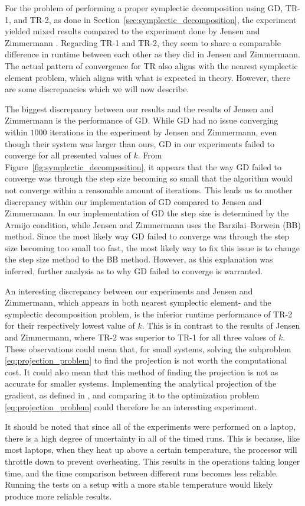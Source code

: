 For the problem of performing a proper symplectic decomposition using GD, TR-1, and TR-2, as done in Section~\ref{sec:symplectic_decomposition}, the experiment yielded mixed results compared to the experiment done by Jensen and Zimmermann \cite[Tbl.~4.4]{JensenZimmermann2024}. Regarding TR-1 and TR-2, they seem to share a comparable difference in runtime between each other as they did in Jensen and Zimmermann. The actual pattern of convergence for TR also aligns with the nearest symplectic element problem, which aligns with what is expected in theory. However, there are some discrepancies which we will now describe. 

The biggest discrepancy between our results and the results of Jensen and Zimmermann \cite[Tbl.~4.4]{JensenZimmermann2024} is the performance of GD. While GD had no issue converging within $1000$ iterations in the experiment by Jensen and Zimmermann, even though their system was larger than ours, GD in our experiments failed to converge for all presented values of $k$. From Figure~\ref{fig:symplectic_decomposition}, it appears that the way GD failed to converge was through the step size becoming so small that the algorithm would not converge within a reasonable amount of iterations. This leads us to another discrepancy within our implementation of GD compared to Jensen and Zimmermann. In our implementation of GD the step size is determined by the Armijo condition, while Jensen and Zimmermann uses the Barzilai–Borwein (BB) method. Since the most likely way GD failed to converge was through the step size becoming too small too fast, the most likely way to fix this issue is to change the step size method to the BB method. However, as this explanation was inferred, further analysis as to why GD failed to converge is warranted.

An interesting discrepancy between our experiments and Jensen and Zimmermann, which appears in both nearest symplectic element- and the symplectic decomposition problem, is the inferior runtime performance of TR-2 for their respectively lowest value of $k$. This is in contrast to the results of Jensen and Zimmermann, where TR-2 was superior to TR-1 for all three values of $k$. These observations could mean that, for small systems, solving the subproblem \eqref{eq:projection_problem} to find the projection is not worth the computational cost. It could also mean that this method of finding the projection is not as accurate for smaller systems. Implementing the analytical projection of the gradient, as defined in \cite[Lem.~2.3]{JensenZimmermann2024}, and comparing it to the optimization problem \eqref{eq:projection_problem} could therefore be an interesting experiment. 

It should be noted that since all of the experiments were performed on a laptop, there is a high degree of uncertainty in all of the timed runs. This is because, like most laptops, when they heat up above a certain temperature, the processor will throttle down to prevent overheating. This results in the operations taking longer time, and the time comparison between different runs becomes less reliable. Running the tests on a setup with a more stable temperature would likely produce more reliable results. 

